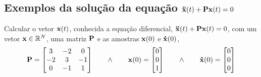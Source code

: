 \subsection{Exemplos da solução da equação $\DDTVECTOR{x}(t) + \MATRIX{P} \VECTOR{x}(t)=0$}

\begin{example}
\label{ex:ddxPx:0}
Calcular o vetor $\VECTOR{x}(t)$,
conhecida a equação diferencial, $\DDTVECTOR{x}(t) + \MATRIX{P} \VECTOR{x}(t)=0$, com 
um vetor $\VECTOR{x} \in \mathbb{R}^{N}$, uma matriz $\MATRIX{P}$ e as amostras $\VECTOR{x}(0)$ e $\VECTOR{\dot{x}}(0)$,
\begin{equation}
\MATRIX{P}=
\begin{bmatrix}
3 & -2 & 0\\
-2 & 3 & -1\\
0 & -1 & 1
\end{bmatrix}
\qquad \wedge \qquad
\VECTOR{x}(0)=
\begin{bmatrix}
0\\
0\\
1
\end{bmatrix}
\qquad \wedge \qquad
\VECTOR{\dot{x}}(0)=
\begin{bmatrix}
0\\
0\\
0
\end{bmatrix} 
\end{equation}
\end{example}


